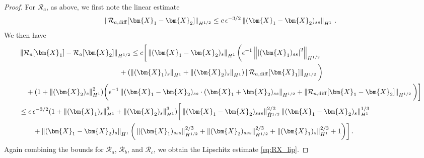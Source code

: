 \documentclass[11pt,reqno]{amsart}
\newcommand{\X}{\bm{X}}
\newcommand{\abs}[1]{\left\lvert #1 \right\rvert}
\newcommand{\norm}[1]{\left\lVert #1 \right\rVert}
\newcommand{\mc}[1]{\mathcal{#1}}
\numberwithin{equation}{section}
\theoremstyle{definition}
\begin{document}
\begin{proof}
For $\mc{R}_a$, as above, we first note the linear estimate
\begin{equation}
  \norm{\mc{R}_{a,{\rm diff}}[\X_1-\X_2]}_{H^{1/2}}\le c\,\epsilon^{-3/2}\norm{(\X_1-\X_2)_{ss}}_{H^1}\,.
\end{equation}
%
%
We then have
\begin{equation}
\begin{aligned}
  &\norm{\mc{R}_a[\X_1]-\mc{R}_a[\X_2]}_{H^{1/2}}
  \le c\bigg[\norm{(\X_1-\X_2)_s}_{H^1}\bigg(\epsilon^{-1}\norm{\abs{(\X_1)_{ss}}^2}_{H^{1/2}} \\
  &\hspace{5cm}
  +(\norm{(\X_1)_s}_{H^1}+\norm{(\X_2)_s}_{H^1})\norm{\mc{R}_{a,{\rm diff}}[\X_1]}_{H^{1/2}}\bigg)\\
  &\quad + (1+\norm{(\X_2)_s}_{H^1}^2)\bigg(\epsilon^{-1}\norm{(\X_1-\X_2)_{ss}\cdot(\X_1+\X_2)_{ss}}_{H^{1/2}} +\norm{\mc{R}_{a,{\rm diff}}[\X_1-\X_2]}_{H^{1/2}}\bigg)\bigg]\\
  &\le c\,\epsilon^{-3/2}(1+\norm{(\X_1)_s}_{H^1}^3+\norm{(\X_2)_s}_{H^1}^3)\bigg[\norm{(\X_1-\X_2)_{sss}}_{\dot H^{1/2}}^{2/3}\norm{(\X_1-\X_2)_s}_{H^1}^{1/3}\\
  &\qquad +\norm{(\X_1-\X_2)_s}_{H^1}\bigg(\norm{(\X_1)_{sss}}_{\dot H^{1/2}}^{2/3}+\norm{(\X_2)_{sss}}_{\dot H^{1/2}}^{2/3} +\norm{(\X_1)_s}_{H^1}^{2/3}+1\bigg) \bigg]\,.
\end{aligned}
\end{equation}
%
%
Again combining the bounds for $\mc{R}_a$, $\mc{R}_b$, and $\mc{R}_c$, we obtain the Lipschitz estimate \eqref{eq:RX_lip}. 
%
%
\end{proof}
\end{document}
